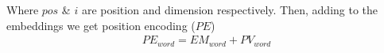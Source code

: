 \documentclass[%
	BCOR=8mm, %
	DIV=12,
	toc=bibliography, %
	toc=listof, %
	oneside, %
	egregdoesnotlikesansseriftitles, %
	]{scrbook}
\begin{document}
Where $pos$ \& $i$ are position and dimension respectively. Then, adding to the embeddings we get position encoding ($PE$)
\begin{equation}
\begin{aligned}
    PE_{word} =EM_{word}+PV_{word}\\
    \label{eq:PE}
\end{aligned}
\end{equation}

%
\end{document}
